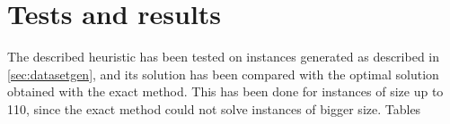 
\section{Tests and results}
\label{sec:results}
The described heuristic has been tested on instances generated as described in \cref{sec:datasetgen}, and its solution has been compared with the optimal solution obtained with the exact method. This has been done for instances of size up to 110, since the exact method could not solve instances of bigger size.
Tables 